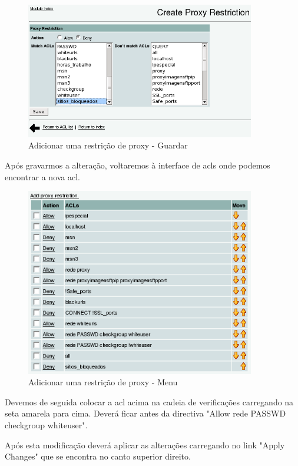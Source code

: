 \begin{figure}[H]
    \begin{center}
        \includegraphics[width=10cm]{include/img/squid6}
    \end{center}
    \caption{Adicionar uma restrição de proxy - Guardar}
    \label{fig:SQUID6}
\end{figure}


Após gravarmos a alteração, voltaremos à interface de acls onde podemos encontrar a nova acl.

\begin{figure}[H]
    \begin{center}
        \includegraphics[width=10cm]{include/img/squid7}
    \end{center}
    \caption{Adicionar uma restrição de proxy - Menu}
    \label{fig:SQUID7}
\end{figure}


Devemos de seguida colocar a acl acima na cadeia de verificações carregando na seta amarela para cima. Deverá ficar antes da directiva "Allow 	rede PASSWD checkgroup whiteuser".

Após esta modificação deverá aplicar as alterações carregando no link "Apply Changes" que se encontra no canto superior direito.
